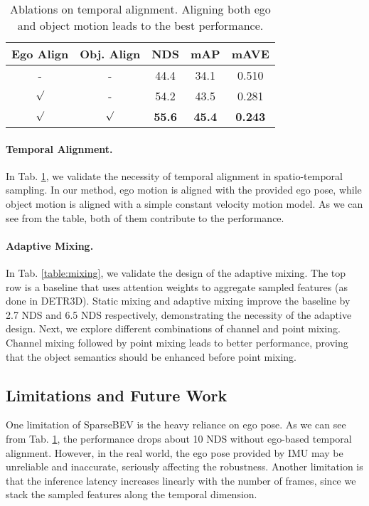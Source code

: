 \documentclass[10pt,twocolumn,letterpaper]{article}
\begin{document}
\begin{table}[t]
  \centering
  \begin{tabular}{cc|ccc}
    \toprule
    Ego Align & Obj. Align & NDS & mAP & mAVE \\
    \midrule
    - & - & 44.4 & 34.1 & 0.510 \\
    $\surd$ & - & 54.2 & 43.5 & 0.281 \\
    $\surd$ & $\surd$ & \textbf{55.6} & \textbf{45.4} & \textbf{0.243} \\
    \bottomrule
  \end{tabular}
  \caption{Ablations on temporal alignment. Aligning both ego and object motion leads to the best performance.}
  \label{table:temporal_align}
  \vspace{-6pt}
\end{table}

\vspace{-5pt}
\paragraph{Temporal Alignment.} In Tab. \ref{table:temporal_align}, we validate the necessity of temporal alignment in spatio-temporal sampling. In our method, ego motion is aligned with the provided ego pose, while object motion is aligned with a simple constant velocity motion model. As we can see from the table, both of them contribute to the performance.

\vspace{-5pt}
\paragraph{Adaptive Mixing.} In Tab. \ref{table:mixing}, we validate the design of the adaptive mixing.
The top row is a baseline that uses attention weights to aggregate sampled features (as done in DETR3D).
Static mixing and adaptive mixing improve the baseline by 2.7 NDS and 6.5 NDS respectively, demonstrating the necessity of the adaptive design.
Next, we explore different combinations of channel and point mixing. Channel mixing followed by point mixing leads to better performance, proving that the object semantics should be enhanced before point mixing.

\subsection{Limitations and Future Work}

One limitation of SparseBEV is the heavy reliance on ego pose. As we can see from Tab. \ref{table:temporal_align}, the performance drops about 10 NDS without ego-based temporal alignment. However, in the real world, the ego pose provided by IMU may be unreliable and inaccurate, seriously affecting the robustness. Another limitation is that the inference latency increases linearly with the number of frames, since we stack the sampled features along the temporal dimension.
\end{document}
